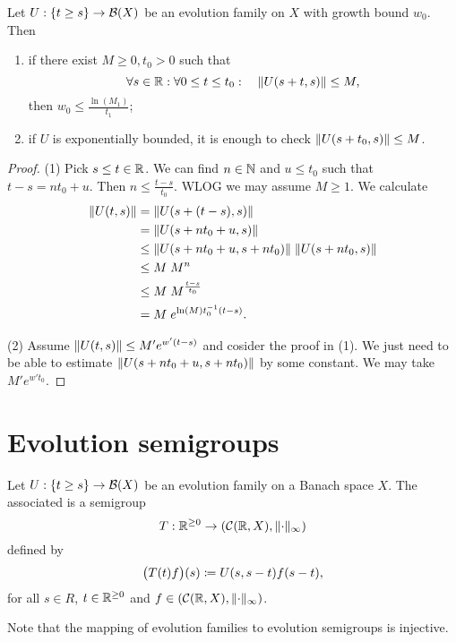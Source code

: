 \begin{proposition}
Let $U: \{t\geq s\}\to \operatorname{\mathcal{B}}(X)$ be an evolution family on $X$ with growth bound $w_0$. Then
\begin{enumerate}
\item if there exist $M\geq 0, t_0>0$ such that
\[ \forall s\in\mathbb{R}: \forall 0\leq t \leq t_0: \quad \lVert U(s+t, s)\rVert\leq M, \]
then $w_0\leq \frac{\ln(M_1)}{t_1}$;
\item if $U$ is exponentially bounded, it is enough to check $\lVert U(s+t_0, s)\rVert\leq M$.
\end{enumerate}
\end{proposition}
\begin{proof}
(1) Pick $s\leq t \in \mathbb{R}$. We can find $n\in \mathbb{N}$ and $u\leq t_0$ such that $t-s = nt_0 + u$. Then $n\leq \frac{t-s}{t_0}$. WLOG we may assume $M\geq 1$. We calculate
\begin{align*}
\lVert U(t,s)\rVert &= \lVert U(s+(t-s), s)\rVert \\
&= \lVert U(s+nt_0 + u, s)\rVert \\
&\leq \lVert U(s+nt_0 + u, s+nt_0)\rVert\;\lVert U(s+nt_0, s)\rVert \\
&\leq M\;M^n \\
&\leq M\;M^{\frac{t-s}{t_0}} \\
&= M\;e^{\ln(M)t_0^{-1}(t-s)}.
\end{align*}

(2) Assume $\lVert U(t,s)\rVert \leq M' e^{w'(t-s)}$ and cosider the proof in (1). We just need to be able to estimate $\lVert U(s+nt_0 + u, s+nt_0)\rVert$ by some constant. We may take $M' e^{w't_0}$.
\end{proof}

\section{Evolution semigroups}
\begin{definition}
Let $U: \{t\geq s\}\to \operatorname{\mathcal{B}}(X)$ be an evolution family on a Banach space $X$. The associated  is a semigroup
\[ T: \mathbb{R}^{\geq 0} \to \left( \operatorname{\mathcal{C}}(\mathbb{R}, X), \lVert\cdot\rVert_\infty \right) \]
defined by
\[ \big(T(t)f\big)(s) \coloneqq U(s,s-t)f(s-t), \]
for all $s\in R$, $t\in\mathbb{R}^{\geq 0}$ and $f\in \left( \operatorname{\mathcal{C}}(\mathbb{R}, X), \lVert\cdot\rVert_\infty \right)$.
\end{definition}

Note that the mapping of evolution families to evolution semigroups is injective.

